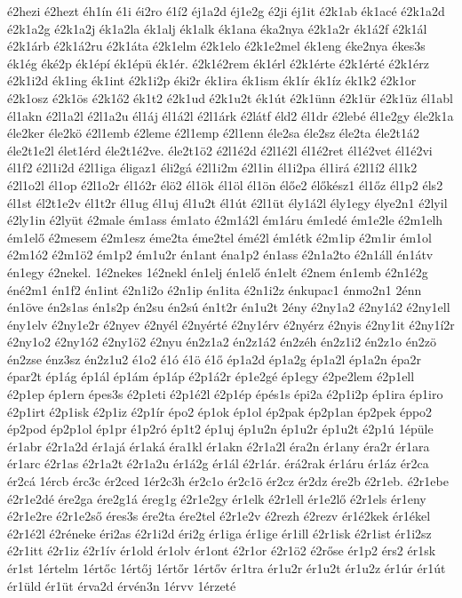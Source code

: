 {é2hezi
é2hezt
éh1ín
é1i
éi2ro
é1í2
éj1a2d
éj1e2g
é2ji
éj1it
é2k1ab
ék1acé
é2k1a2d
é2k1a2g
é2k1a2j
ék1a2la
ék1alj
ék1alk
ék1ana
éka2nya
é2k1a2r
ék1á2f
é2k1ál
é2k1árb
é2k1á2ru
é2k1áta
é2k1elm
é2k1elo
é2k1e2mel
ék1eng
éke2nya
ékes3s
ék1ég
éké2p
ék1épí
ék1épü
ék1ér.
é2k1é2rem
ék1érl
é2k1érte
é2k1érté
é2k1érz
é2k1i2d
ék1ing
ék1int
é2k1i2p
éki2r
ék1ira
ék1ism
ék1ír
ék1íz
ék1k2
é2k1or
é2k1osz
é2k1ös
é2k1ő2
ék1t2
é2k1ud
é2k1u2t
ék1út
é2k1ünn
é2k1ür
é2k1üz
él1abl
él1akn
é2l1a2l
é2l1a2u
él1áj
él1á2l
é2l1árk
é2látf
éld2
él1dr
é2lebé
él1e2gy
éle2k1a
éle2ker
éle2kö
é2l1emb
é2leme
é2l1emp
é2l1enn
éle2sa
éle2sz
éle2ta
éle2t1á2
éle2t1e2l
élet1érd
éle2t1é2ve.
éle2t1ö2
é2l1é2d
é2l1é2l
él1é2ret
él1é2vet
él1é2vi
él1f2
é2l1i2d
é2l1iga
éligaz1
éli2gá
é2l1i2m
é2l1in
él1i2pa
él1irá
é2l1í2
él1k2
é2l1o2l
él1op
é2l1o2r
él1ó2r
élö2
él1ök
él1öl
él1ön
élőe2
élőkész1
él1őz
él1p2
éls2
él1st
él2t1e2v
él1t2r
él1ug
él1uj
él1u2t
él1út
é2l1üt
ély1á2l
ély1egy
élye2n1
é2lyil
é2ly1in
é2lyüt
é2male
ém1ass
ém1ato
é2m1á2l
ém1áru
ém1edé
ém1e2le
é2m1elh
ém1elő
é2mesem
é2m1esz
éme2ta
éme2tel
émé2l
ém1étk
é2m1ip
é2m1ir
ém1ol
é2m1ó2
é2m1ö2
ém1p2
ém1u2r
én1ant
éna1p2
én1ass
é2n1a2to
é2n1áll
én1átv
én1egy
é2nekel.
1é2nekes
1é2nekl
én1elj
én1elő
én1elt
é2nem
én1emb
é2n1é2g
éné2m1
én1f2
én1int
é2n1i2o
é2n1ip
én1ita
é2n1i2z
énkupac1
énmo2n1
2énn
én1öve
én2s1as
én1s2p
én2su
én2sú
én1t2r
én1u2t
2ény
é2ny1a2
é2ny1á2
é2ny1ell
ény1elv
é2ny1e2r
é2nyev
é2nyél
é2nyérté
é2ny1érv
é2nyérz
é2nyis
é2ny1it
é2ny1í2r
é2ny1o2
é2ny1ó2
é2ny1ö2
é2nyu
én2z1a2
én2z1á2
én2zéh
én2z1i2
én2z1o
én2zö
én2zse
énz3sz
én2z1u2
é1o2
é1ó
é1ö
é1ő
ép1a2d
ép1a2g
ép1a2l
ép1a2n
épa2r
épar2t
ép1ág
ép1ál
ép1ám
ép1áp
é2p1á2r
ép1e2gé
ép1egy
é2pe2lem
é2p1ell
é2p1ep
ép1ern
épes3s
é2p1eti
é2p1é2l
é2p1ép
épés1s
épi2a
é2p1i2p
ép1ira
ép1iro
é2p1irt
é2p1isk
é2p1iz
é2p1ír
épo2
ép1ok
ép1ol
ép2pak
ép2p1an
ép2pek
éppo2
ép2pod
ép2p1ol
ép1pr
é1p2ró
ép1t2
ép1uj
ép1u2n
ép1u2r
ép1u2t
é2p1ú
1épüle
ér1abr
é2r1a2d
ér1ajá
ér1aká
éra1kl
ér1akn
é2r1a2l
éra2n
ér1any
éra2r
ér1ara
ér1arc
é2r1as
é2r1a2t
é2r1a2u
ér1á2g
ér1ál
é2r1ár.
érá2rak
ér1áru
ér1áz
ér2ca
ér2cá
1ércb
érc3c
ér2ced
1ér2c3h
ér2c1o
ér2c1ö
ér2cz
ér2dz
ére2b
é2r1eb.
é2r1ebe
é2r1e2dé
ére2ga
ére2g1á
éreg1g
é2r1e2gy
ér1elk
é2r1ell
ér1e2lő
é2r1els
ér1eny
é2r1e2re
é2r1e2ső
éres3s
ére2ta
ére2tel
é2r1e2v
é2rezh
é2rezv
ér1é2kek
ér1ékel
é2r1é2l
é2réneke
éri2as
é2r1i2d
éri2g
ér1iga
ér1ige
ér1ill
é2r1isk
é2r1ist
ér1i2sz
é2r1itt
é2r1iz
é2r1ív
ér1old
ér1olv
ér1ont
é2r1or
é2r1ö2
é2rőse
ér1p2
érs2
ér1sk
ér1st
1értelm
1értőc
1értőj
1értőr
1értőv
ér1tra
ér1u2r
ér1u2t
ér1u2z
ér1úr
ér1út
ér1üld
ér1üt
érva2d
érvén3n
1érvv
1érzeté
}
